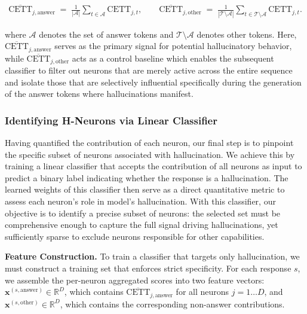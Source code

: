 \documentclass[dvipsnames]{article}
\begin{document}
\begin{align}
\overline{\mathrm{CETT}}_{j,\text{answer}} \;=\; \frac{1}{|\mathcal{A}|}\sum_{t\in\mathcal{A}} \mathrm{CETT}_{j,t}, 
\qquad
\overline{\mathrm{CETT}}_{j,\text{other}} \;=\; \frac{1}{|\mathcal{T}\setminus\mathcal{A}|}\sum_{t\in\mathcal{T}\setminus\mathcal{A}} \mathrm{CETT}_{j,t}.
\end{align}

where $\mathcal{A}$ denotes the set of answer tokens and $\mathcal{T}\setminus\mathcal{A}$ denotes other tokens.
Here, $\overline{\mathrm{CETT}}_{j,\text{answer}}$ serves as the primary signal for potential hallucinatory behavior, while $\overline{\mathrm{CETT}}_{j,\text{other}}$ acts as a control baseline which enables the subsequent classifier to filter out neurons that are merely active across the entire sequence and isolate those that are selectively influential specifically during the generation of the answer tokens where hallucinations manifest.

\subsubsection{Identifying H-Neurons via Linear Classifier}
Having quantified the contribution of each neuron, our final step is to pinpoint the specific subset of neurons associated with hallucination. We achieve this by training a linear classifier that accepts the contribution of all neurons as input to predict a binary label indicating whether the response is a hallucination. The learned weights of this classifier then serve as a direct quantitative metric to assess each neuron’s role in model's hallucination. With this classifier, our objective is to identify a precise subset of neurons: the selected set must be comprehensive enough to capture the full signal driving hallucinations, yet sufficiently sparse to exclude neurons responsible for other capabilities.

\textbf{Feature Construction.}\quad
To train a classifier that targets only hallucination, we must construct a training set that enforces strict specificity.
For each response \(s\), we assemble the per-neuron aggregated scores into two feature vectors: \(\mathbf{x}^{(s,\text{answer})} \in \mathbb{R}^{D}\), which contains \(\overline{\mathrm{CETT}}_{j,\text{answer}}\) for all neurons \(j=1\dots D\), and \(\mathbf{x}^{(s,\text{other})} \in \mathbb{R}^{D}\), which contains the corresponding non-answer contributions.
\end{document}
